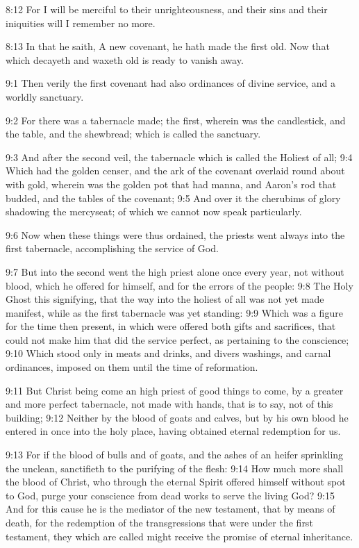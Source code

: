 8:12 For I will be merciful to their unrighteousness, and their sins and their iniquities will I remember no more.

8:13 In that he saith, A new covenant, he hath made the first old. Now that which decayeth and waxeth old is ready to vanish away.

9:1 Then verily the first covenant had also ordinances of divine service, and a worldly sanctuary.

9:2 For there was a tabernacle made; the first, wherein was the candlestick, and the table, and the shewbread; which is called the sanctuary.

9:3 And after the second veil, the tabernacle which is called the Holiest of all; 9:4 Which had the golden censer, and the ark of the covenant overlaid round about with gold, wherein was the golden pot that had manna, and Aaron's rod that budded, and the tables of the covenant; 9:5 And over it the cherubims of glory shadowing the mercyseat; of which we cannot now speak particularly.

9:6 Now when these things were thus ordained, the priests went always into the first tabernacle, accomplishing the service of God.

9:7 But into the second went the high priest alone once every year, not without blood, which he offered for himself, and for the errors of the people: 9:8 The Holy Ghost this signifying, that the way into the holiest of all was not yet made manifest, while as the first tabernacle was yet standing: 9:9 Which was a figure for the time then present, in which were offered both gifts and sacrifices, that could not make him that did the service perfect, as pertaining to the conscience; 9:10 Which stood only in meats and drinks, and divers washings, and carnal ordinances, imposed on them until the time of reformation.

9:11 But Christ being come an high priest of good things to come, by a greater and more perfect tabernacle, not made with hands, that is to say, not of this building; 9:12 Neither by the blood of goats and calves, but by his own blood he entered in once into the holy place, having obtained eternal redemption for us.

9:13 For if the blood of bulls and of goats, and the ashes of an heifer sprinkling the unclean, sanctifieth to the purifying of the flesh: 9:14 How much more shall the blood of Christ, who through the eternal Spirit offered himself without spot to God, purge your conscience from dead works to serve the living God?  9:15 And for this cause he is the mediator of the new testament, that by means of death, for the redemption of the transgressions that were under the first testament, they which are called might receive the promise of eternal inheritance.

